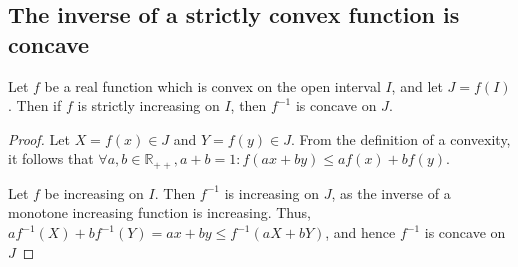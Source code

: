 \begin{appendices}
\subsection{The inverse of a strictly convex function is concave} %
\label{sub:the_inverse_of_a_strictly_convex_function_is_concave}
\begin{theorem}
Let \(f\) be a real function which is convex on the open interval \(I\), and let \(J=f(I)\). Then if \(f\) is strictly increasing on \(I\), then \(f^{-1}\) is concave on \(J\).
\end{theorem}
 \begin{proof}
 Let \(X=f(x)\in J\) and \(Y=f(y)\in J\). From the definition of a convexity, it follows that \(\forall a,b\in \mathbb{R}_{++}, a+b=1:f(ax+by)\leq af(x)+bf(y)\). 

Let \(f\) be increasing on \(I\). Then \(f^{-1}\) is increasing on \(J\), as the inverse of a monotone increasing function is increasing. Thus, \(af^{-1}(X)+bf^{-1}(Y)=ax+by\leq f^{-1}(aX+bY)\), and hence \(f^{-1}\) is concave on \(J\)
 \end{proof}
\end{appendices}
